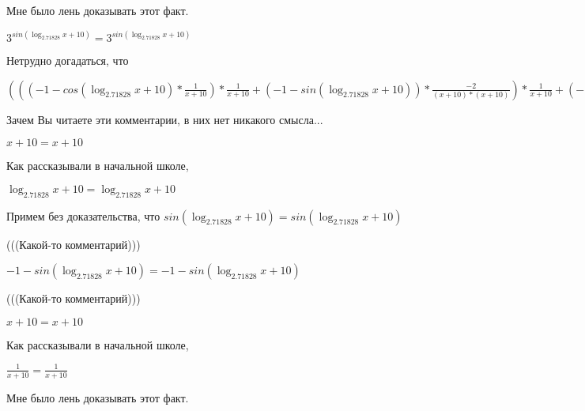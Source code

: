 \documentclass[12pt,a4paper,fleqn]{article}
\theoremstyle{definition}
\begin{document}
Мне было лень доказывать этот факт.

${ 3 }^{sin(\log_{ 2.71828 }{ x  +  10 })} = { 3 }^{sin(\log_{ 2.71828 }{ x  +  10 })}$

Нетрудно догадаться, что

$((( -1  - cos(\log_{ 2.71828 }{ x  +  10 }) * \frac{ 1 }{ x  +  10 }
) * \frac{ 1 }{ x  +  10 }
 + ( -1  - sin(\log_{ 2.71828 }{ x  +  10 })) * \frac{ -2 }{( x  +  10 ) * ( x  +  10 )}
) * \frac{ 1 }{ x  +  10 }
 + ( -1  - sin(\log_{ 2.71828 }{ x  +  10 })) * \frac{ 1 }{ x  +  10 }
 * \frac{ -2 }{( x  +  10 ) * ( x  +  10 )}
 + ( -1  - sin(\log_{ 2.71828 }{ x  +  10 })) * \frac{ 1 }{ x  +  10 }
 * \frac{ -2 }{( x  +  10 ) * ( x  +  10 )}
 + cos(\log_{ 2.71828 }{ x  +  10 }) * \frac{ -1  -  -2  * ( x  +  10  +  x  +  10 )}{( x  +  10 ) * ( x  +  10 ) * ( x  +  10 ) * ( x  +  10 )}
) * { 3 }^{sin(\log_{ 2.71828 }{ x  +  10 })} = ((( -1  - cos(\log_{ 2.71828 }{ x  +  10 }) * \frac{ 1 }{ x  +  10 }
) * \frac{ 1 }{ x  +  10 }
 + ( -1  - sin(\log_{ 2.71828 }{ x  +  10 })) * \frac{ -2 }{( x  +  10 ) * ( x  +  10 )}
) * \frac{ 1 }{ x  +  10 }
 + ( -1  - sin(\log_{ 2.71828 }{ x  +  10 })) * \frac{ 1 }{ x  +  10 }
 * \frac{ -2 }{( x  +  10 ) * ( x  +  10 )}
 + ( -1  - sin(\log_{ 2.71828 }{ x  +  10 })) * \frac{ 1 }{ x  +  10 }
 * \frac{ -2 }{( x  +  10 ) * ( x  +  10 )}
 + cos(\log_{ 2.71828 }{ x  +  10 }) * \frac{ -1  -  -2  * ( x  +  10  +  x  +  10 )}{( x  +  10 ) * ( x  +  10 ) * ( x  +  10 ) * ( x  +  10 )}
) * { 3 }^{sin(\log_{ 2.71828 }{ x  +  10 })}$

Зачем Вы читаете эти комментарии, в них нет никакого смысла...

$ x  +  10  =  x  +  10 $

Как рассказывали в начальной школе,

$\log_{ 2.71828 }{ x  +  10 } = \log_{ 2.71828 }{ x  +  10 }$

Примем без доказательства, что
$sin(\log_{ 2.71828 }{ x  +  10 }) = sin(\log_{ 2.71828 }{ x  +  10 })$

(((Какой-то комментарий)))

$ -1  - sin(\log_{ 2.71828 }{ x  +  10 }) =  -1  - sin(\log_{ 2.71828 }{ x  +  10 })$

(((Какой-то комментарий)))

$ x  +  10  =  x  +  10 $

Как рассказывали в начальной школе,

$\frac{ 1 }{ x  +  10 }
 = \frac{ 1 }{ x  +  10 }
$

Мне было лень доказывать этот факт.
\end{document}
